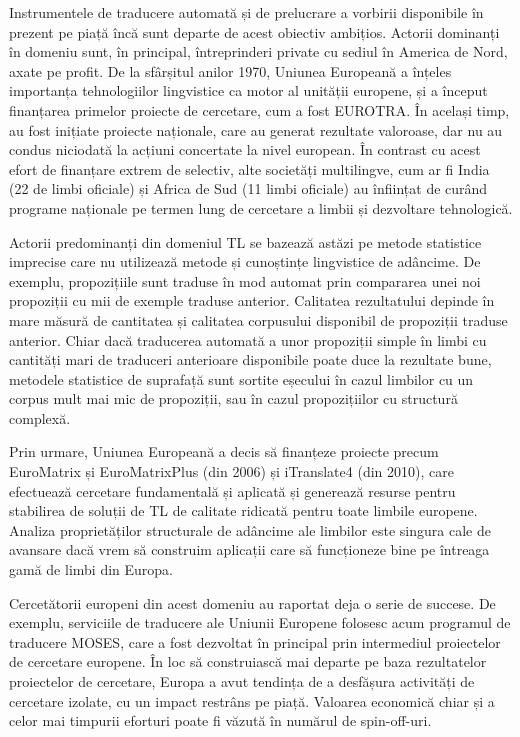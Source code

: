 \documentclass[]{../../metanetpaper}
\begin{document}
\begin{multicols}{2}
Instrumentele de traducere automată și de prelucrare a vorbirii disponibile în prezent pe piață încă sunt departe de acest obiectiv ambițios. Actorii dominanți în domeniu sunt, în principal, întreprinderi private cu sediul în America de Nord, axate pe profit. De la sfârșitul anilor 1970, Uniunea Europeană a înțeles importanța tehnologiilor lingvistice ca motor al unității europene, și a început finanțarea primelor proiecte de cercetare, cum a fost EUROTRA. În același timp, au fost inițiate proiecte naționale, care au generat rezultate valoroase, dar nu au condus niciodată la acțiuni concertate la nivel european. În contrast cu acest efort de finanțare extrem de selectiv, alte societăți multilingve, cum ar fi India (22 de limbi oficiale) și Africa de Sud (11 limbi oficiale) au înființat de curând programe naționale pe termen lung de cercetare a limbii și dezvoltare tehnologică.


Actorii predominanți din domeniul TL se bazează astăzi pe metode statistice imprecise care nu utilizează metode și cunoștințe lingvistice de adâncime. De exemplu, propozițiile sunt traduse în mod automat prin compararea unei noi propoziții cu mii de exemple traduse anterior. Calitatea rezultatului depinde în mare măsură de cantitatea și calitatea corpusului disponibil de propoziții traduse anterior. Chiar dacă traducerea automată a unor propoziții simple în limbi cu cantități mari de traduceri anterioare disponibile poate duce la rezultate bune, metodele statistice de suprafață sunt sortite eșecului în cazul limbilor cu un corpus mult mai mic de propoziții, sau în cazul propozițiilor cu structură complexă.

Prin urmare, Uniunea Europeană a decis să finanțeze proiecte precum EuroMatrix și EuroMatrixPlus (din 2006) și iTranslate4 (din 2010), care efectuează cercetare fundamentală și aplicată și generează resurse pentru stabilirea de soluții de TL de calitate ridicată pentru toate limbile europene. Analiza proprietăților structurale de adâncime ale limbilor este singura cale de avansare dacă vrem să construim aplicații care să funcționeze bine pe întreaga gamă de limbi din Europa.

Cercetătorii europeni din acest domeniu au raportat deja o serie de succese. De exemplu, serviciile de traducere ale Uniunii Europene folosesc acum programul de traducere MOSES, care a fost dezvoltat în principal prin intermediul proiectelor de cercetare europene. În loc să construiască mai departe pe baza rezultatelor proiectelor de cercetare, Europa a avut tendința de a desfășura activități de cercetare izolate, cu un impact restrâns pe piață. Valoarea economică chiar și a celor mai timpurii eforturi poate fi văzută în numărul de spin-off-uri.


\end{multicols}
\end{document}
